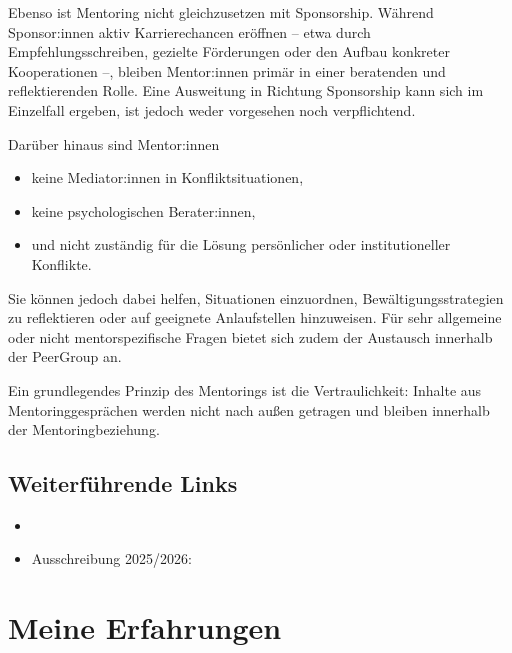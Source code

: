 \documentclass[letterpaper,10pt,english]{jupyterBook}
\begin{document}
\sphinxAtStartPar
Ebenso ist Mentoring nicht gleichzusetzen mit Sponsorship. Während Sponsor:innen aktiv Karrierechancen eröffnen – etwa durch Empfehlungsschreiben, gezielte Förderungen oder den Aufbau konkreter Kooperationen –, bleiben Mentor:innen primär in einer beratenden und reflektierenden Rolle. Eine Ausweitung in Richtung Sponsorship kann sich im Einzelfall ergeben, ist jedoch weder vorgesehen noch verpflichtend.

\sphinxAtStartPar
Darüber hinaus sind Mentor:innen
\begin{itemize}
\item {} 
\sphinxAtStartPar
keine Mediator:innen in Konfliktsituationen,

\item {} 
\sphinxAtStartPar
keine psychologischen Berater:innen,

\item {} 
\sphinxAtStartPar
und nicht zuständig für die Lösung persönlicher oder institutioneller Konflikte.

\end{itemize}

\sphinxAtStartPar
Sie können jedoch dabei helfen, Situationen einzuordnen, Bewältigungsstrategien zu reflektieren oder auf geeignete Anlaufstellen hinzuweisen. Für sehr allgemeine oder nicht mentorspezifische Fragen bietet sich zudem der Austausch innerhalb der Peer\sphinxhyphen{}Group an.

\sphinxAtStartPar
Ein grundlegendes Prinzip des Mentorings ist die Vertraulichkeit: Inhalte aus Mentoringgesprächen werden nicht
nach außen getragen und bleiben innerhalb der Mentoringbeziehung.


\section{Weiterführende Links}
\label{\detokenize{mentoring/programm:weiterfuhrende-links}}\begin{itemize}
\item {} 
\sphinxAtStartPar
{}

\item {} 
\sphinxAtStartPar
Ausschreibung 2025/2026: 

\end{itemize}

\sphinxstepscope


\chapter{Meine Erfahrungen}
\label{\detokenize{mentoring/meine-erfahrungen:meine-erfahrungen}}\label{\detokenize{mentoring/meine-erfahrungen::doc}}
\end{document}
